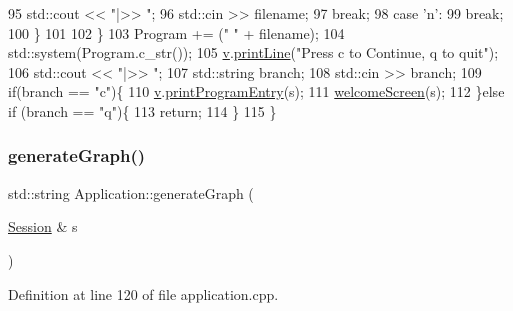 \begin{DoxyCode}
95                 std::cout << \textcolor{stringliteral}{"|>> "};
96                 std::cin >> filename;
97                 \textcolor{keywordflow}{break};
98             \textcolor{keywordflow}{case} \textcolor{charliteral}{'n'}:
99                 \textcolor{keywordflow}{break};
100         \}
101 
102     \}
103     Program += (\textcolor{stringliteral}{" "} + filename);
104     std::system(Program.c\_str());
105     \hyperlink{class_application_a96cff2295a95d7e6de06638bb7e61243}{v}.\hyperlink{class_visualize_abce6cd538dc0715b21851e0bf0377d85}{printLine}(\textcolor{stringliteral}{"Press c to Continue, q to quit"});
106         std::cout << \textcolor{stringliteral}{"|>> "};
107         std::string branch;
108         std::cin >> branch;
109         \textcolor{keywordflow}{if}(branch == \textcolor{stringliteral}{"c"})\{
110             \hyperlink{class_application_a96cff2295a95d7e6de06638bb7e61243}{v}.\hyperlink{class_visualize_a29f27ff8c5e59163eea2be42ff372405}{printProgramEntry}(s);
111             \hyperlink{class_application_abf73a60a6a2e4b83a675de777273d12c}{welcomeScreen}(s);
112         \}\textcolor{keywordflow}{else} \textcolor{keywordflow}{if} (branch == \textcolor{stringliteral}{"q"})\{
113             \textcolor{keywordflow}{return};
114         \}
115 \}
\end{DoxyCode}
\mbox{\label{class_application_a169c37596e9a7a9e0546700876adcbe7}} 
\subsubsection{\texorpdfstring{generate\+Graph()}{generateGraph()}}
{\footnotesize\ttfamily std\+::string Application\+::generate\+Graph (\begin{DoxyParamCaption}\item[{\hyperlink{struct_session}{Session} \&}]{s }\end{DoxyParamCaption})}



Definition at line 120 of file application.\+cpp.


